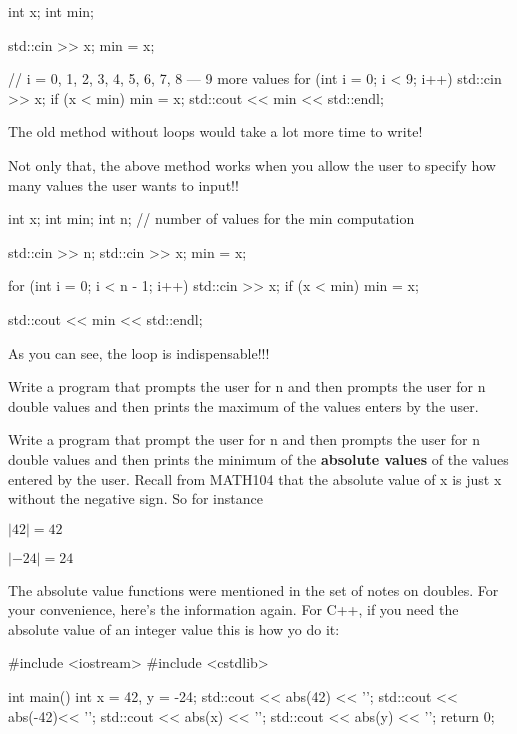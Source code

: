 \begin{console}
int x;
int min;

std::cin >> x;
min = x;

// i = 0, 1, 2, 3, 4, 5, 6, 7, 8 --- 9 more values
for (int i = 0; i < 9; i++)
{   
    std::cin >> x;
    if (x < min)
    {
        min = x;
    }
}
std::cout << min << std::endl;
\end{console}

The old method without loops would take a lot more time to write!

Not only that, the above method works when you allow the user to specify
how many values the user wants to input!!

\begin{console}
int x;
int min;
int n; // number of values for the min computation

std::cin >> n;
std::cin >> x;
min = x;

for (int i = 0; i < n - 1; i++)
{   
    std::cin >> x;
    if (x < min)
    {
        min = x;
    }
}

std::cout << min << std::endl;
\end{console}

As you can see, the loop is indispensable!!!
\begin{ex}
Write a program that prompts the user for n and then
prompts the user for n double values and then prints the maximum of the
values enters by the user.
\end{ex}
\begin{ex}
 Write a program that prompt the user for n and then
prompts the user for n double values and then prints the minimum of the
\textbf{absolute values} of the values entered by the user. Recall from
MATH104 that the absolute value of x is just x without the negative
sign. So for instance
\end{ex}
\begin{center}
$|42| = 42$

$|-24| = 24$
\end{center}

The absolute value functions were mentioned in the set of notes on
doubles. For your convenience, here's the information
again. For C++, if you need the absolute value of an integer value this
is how yo do it:
\begin{console}
#include <iostream>
#include <cstdlib>

int main()
{   
    int x = 42, y = -24;
    std::cout << abs(42) << '\n';
    std::cout << abs(-42)<< '\n'; 
    std::cout << abs(x) << '\n'; 
    std::cout << abs(y) << '\n';
    return 0;
}
\end{console}

